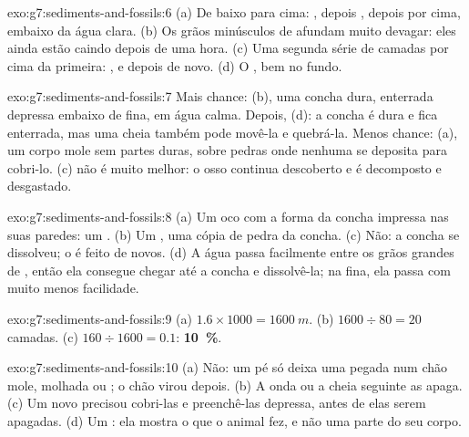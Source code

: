 \begin{solution}{exo:g7:sediments-and-fossils:6}
(a) De baixo para cima: , depois , depois  por cima,
embaixo da água clara. (b) Os grãos minúsculos de  afundam muito
devagar: eles ainda estão caindo depois de uma hora. (c) Uma segunda
série de camadas por cima da primeira: , e depois  de novo.
(d) O , bem no fundo.
\end{solution}

\begin{solution}{exo:g7:sediments-and-fossils:7}
Mais chance: (b), uma concha dura, enterrada depressa embaixo de 
fina, em água calma. Depois, (d): a concha é dura e fica enterrada, mas
uma cheia também pode movê-la e quebrá-la. Menos chance: (a), um corpo
mole sem partes duras, sobre pedras onde nenhuma  se deposita para
cobri-lo. (c) não é muito melhor: o osso continua descoberto e é
decomposto e desgastado.
\end{solution}

\begin{solution}{exo:g7:sediments-and-fossils:8}
(a) Um oco com a forma da concha impressa nas suas paredes: um .
(b) Um , uma cópia de pedra da concha. (c) Não: a concha se
dissolveu; o  é feito de  novos. (d) A água passa
facilmente entre os grãos grandes de , então ela consegue chegar
até a concha e dissolvê-la; na  fina, ela passa com muito menos
facilidade.
\end{solution}

\begin{solution}{exo:g7:sediments-and-fossils:9}
(a) $1.6 \times 1000 = \qty{1600}{m}$. (b) $1600 \div 80 = 20$ camadas.
(c) $160 \div 1600 = 0.1$: \textbf{10~\%}.
\end{solution}

\begin{solution}{exo:g7:sediments-and-fossils:10}
(a) Não: um pé só deixa uma pegada num chão mole,  molhada ou ;
o chão virou  depois. (b) A onda ou a cheia seguinte as apaga.
(c) Um novo  precisou cobri-las e preenchê-las depressa, antes
de elas serem apagadas. (d) Um : ela mostra o que o animal fez,
e não uma parte do seu corpo.
\end{solution}

